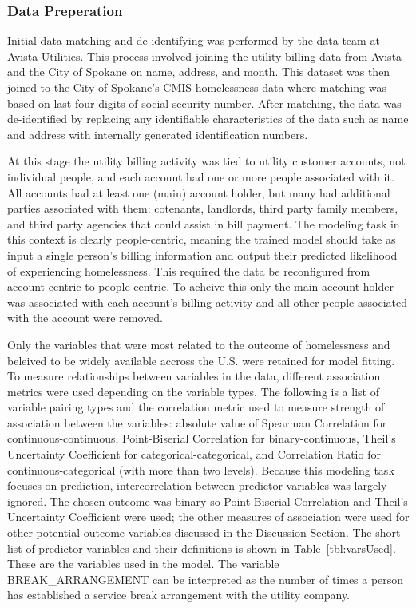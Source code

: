 \documentclass[10pt,letterpaper]{article}
\begin{document}
\subsubsection*{Data Preperation}
Initial data matching and de-identifying was performed by the data team at Avista Utilities. This process involved joining the utility billing data from Avista and the City of Spokane on name, address, and month. This dataset was then joined to the City of Spokane's CMIS homelessness data where matching was based on last four digits of social security number. After matching, the data was de-identified by replacing any identifiable characteristics of the data such as name and address with internally generated identification numbers. 

At this stage the utility billing activity was tied to utility customer accounts, not individual people, and each account had one or more people associated with it. All accounts had at least one (main) account holder, but many had additional parties associated with them: cotenants, landlords, third party family members, and third party agencies that could assist in bill payment. The modeling task in this context is clearly people-centric, meaning the trained model should take as input a single person's billing information and output their predicted likelihood of experiencing homelessness. This required the data be reconfigured from account-centric to people-centric. To acheive this only the main account holder was associated with each account's billing activity and all other people associated with the account were removed.

Only the variables that were most related to the outcome of homelessness and beleived to be widely available accross the U.S. were retained for model fitting. To measure relationships between variables in the data, different association metrics were used depending on the variable types. The following is a list of variable pairing types and the correlation metric used to measure strength of association between the variables: absolute value of Spearman Correlation for continuous-continuous, Point-Biserial Correlation for binary-continuous, Theil's Uncertainty Coefficient for categorical-categorical, and Correlation Ratio for continuous-categorical (with more than two levels). Because this modeling task focuses on prediction, intercorrelation between predictor variables was largely ignored. The chosen outcome was binary so Point-Biserial Correlation and Theil's Uncertainty Coefficient were used; the other measures of association were used for other potential outcome variables discussed in the Discussion Section. The short list of predictor variables and their definitions is shown in Table~\ref{tbl:varsUsed}. These are the variables used in the model. The variable BREAK\_ARRANGEMENT can be interpreted as the number of times a person has established a service break arrangement with the utility company.
\end{document}
